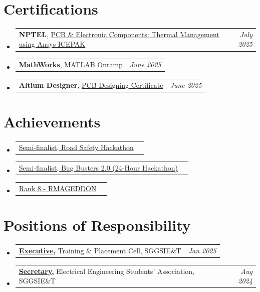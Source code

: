 \documentclass[a4paper,11pt]{article}
\makeatletter
\newcommand{\resumePOR}[3]{
\vspace{0.5mm}\item
    \begin{tabular*}{0.97\textwidth}[t]{l@{\extracolsep{\fill}}r}
        \textbf{#1}\hspace{0.3mm}#2 & \textit{\small{#3}} 
    \end{tabular*}
    \vspace{-2mm}
}
\newcommand{\resumeSubHeadingListStart}{\begin{itemize}[leftmargin=*,labelsep=1mm]}
\newcommand{\resumeSubHeadingListEnd}{\end{itemize}\vspace{2mm}}
\makeatother
\begin{document}
\section{\textbf{Certifications}}
\vspace{-0.4mm}
\resumeSubHeadingListStart
\resumePOR
    {NPTEL} %
    {, \href{https://www.linkedin.com/in/aryansakhare/details/certifications/1761338998542/single-media-viewer/?type=IMAGE\&profileId=ACoAAEHR75wB5JC8UfHXAkh3hzJOB8jS1o9-Bcw}{PCB \& Electronic Components: Thermal Management using Ansys ICEPAK}} %
    {July 2025} %
    \resumePOR
    {MathWorks}
    {, \href{https://matlabacademy.mathworks.com/progress/share/certificate.html?id=be5ad319-a5a8-42c1-bf59-202ade75dfe4\&}{MATLAB Onramp}}
    {June 2025}
\resumePOR
    {Altium Designer} %
    {, \href{https://www.linkedin.com/in/aryansakhare/details/certifications/1749227339915/single-media-viewer/?type=DOCUMENT\&profileId=ACoAAEHR75wB5JC8UfHXAkh3hzJOB8jS1o9-Bcw}{PCB Designing Certificate}} %
    {June 2025} %

\resumeSubHeadingListEnd

\vspace{-6mm}

\section{\textbf{Achievements}}
\vspace{-0.2mm}
\resumeSubHeadingListStart
\resumePOR{}{\href{https://unstop.com/certificate-preview/9439aac1-14d0-481e-9901-9ade1d70dcd6 }{  Semi-finalist, Road Safety Hackathon }}{}
\resumePOR{}{\href{https://www.linkedin.com/in/aryansakhare/details/certifications/1761327580034/single-media-viewer/?type=IMAGE\&profileId=ACoAAEHR75wB5JC8UfHXAkh3hzJOB8jS1o9-Bcw }{ Semi-finalist, Bug Busters 2.0 (24-Hour Hackathon) }}{}
\resumePOR{}{\href{https://www.linkedin.com/in/aryansakhare/details/certifications/1725027408621/single-media-viewer/?profileId=ACoAAEHR75wB5JC8UfHXAkh3hzJOB8jS1o9-Bcw }{ Rank 8 - RMAGEDDON }}{}

\resumeSubHeadingListEnd
\vspace{-6mm}

\section{\textbf{Positions of Responsibility}}
\vspace{-0.4mm}
\resumeSubHeadingListStart
    \resumePOR{\href{https://tnpsggs.in/contactus}{Executive}, } %
    {Training \& Placement Cell, SGGSIE\&T} %
    {Jan 2025} %

    \resumePOR{\href{https://www.linkedin.com/company/eesa-sggsiet/posts/?feedView=all}{Secretary}, } %
    {Electrical Engineering Students' Association, SGGSIE\&T} %
    {Aug 2024} %



\resumeSubHeadingListEnd
\vspace{-5mm}
\end{document}
